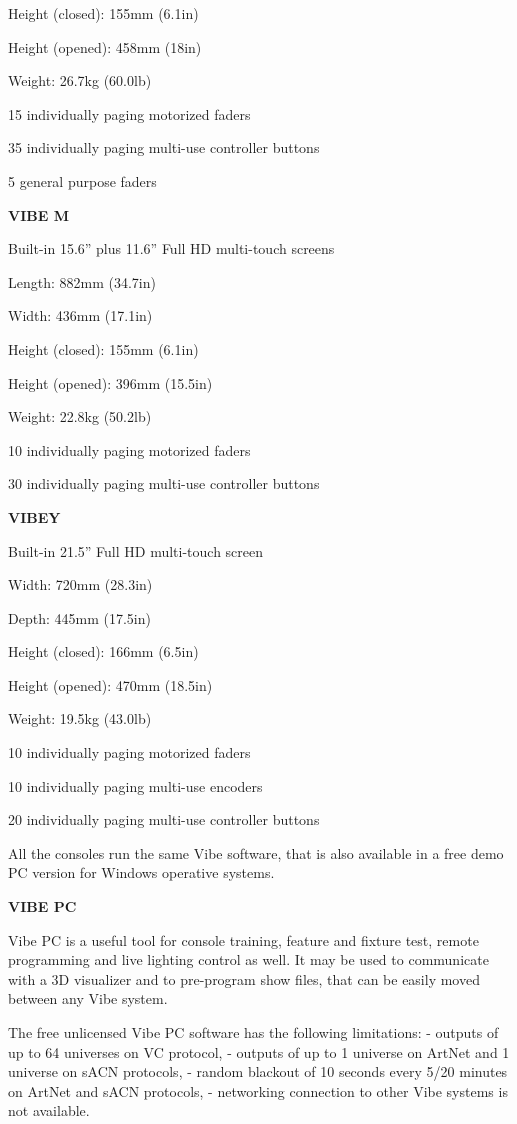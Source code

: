 \documentclass[
]{article}
\begin{document}
Height (closed): 155mm (6.1in)

Height (opened): 458mm (18in)

Weight: 26.7kg (60.0lb)

15 individually paging motorized faders

35 individually paging multi-use controller buttons

5 general purpose faders

\textbf{VIBE M}

Built-in 15.6'' plus 11.6'' Full HD multi-touch screens

Length: 882mm (34.7in)

Width: 436mm (17.1in)

Height (closed): 155mm (6.1in)

Height (opened): 396mm (15.5in)

Weight: 22.8kg (50.2lb)

10 individually paging motorized faders

30 individually paging multi-use controller buttons

\textbf{VIBEY}

Built-in 21.5'' Full HD multi-touch screen

Width: 720mm (28.3in)

Depth: 445mm (17.5in)

Height (closed): 166mm (6.5in)

Height (opened): 470mm (18.5in)

Weight: 19.5kg (43.0lb)

10 individually paging motorized faders

10 individually paging multi-use encoders

20 individually paging multi-use controller buttons

All the consoles run the same Vibe software, that is also available in a free demo PC version for Windows operative systems.

\textbf{VIBE PC}

Vibe PC is a useful tool for console training, feature and fixture test, remote programming and live lighting control as well. It may be used to communicate with a 3D visualizer and to pre-program show files, that can be easily moved between any Vibe system.

The free unlicensed Vibe PC software has the following limitations:
- outputs of up to 64 universes on VC protocol,
- outputs of up to 1 universe on ArtNet and 1 universe on sACN protocols,
- random blackout of 10 seconds every 5/20 minutes on ArtNet and sACN protocols,
- networking connection to other Vibe systems is not available.
\end{document}
